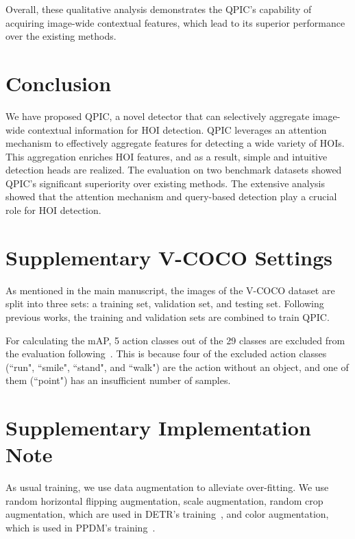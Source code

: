 \documentclass[final]{cvpr}
\begin{document}
Overall, these qualitative analysis demonstrates the QPIC's capability of acquiring image-wide contextual features, which lead to its superior performance over the existing methods. 

\section{Conclusion}
We have proposed QPIC, a novel detector that can selectively aggregate image-wide contextual information for HOI detection. QPIC leverages an attention mechanism to effectively aggregate features for detecting a wide variety of HOIs. 
This aggregation enriches HOI features, and as a result, simple and intuitive detection heads are realized.
The evaluation on two benchmark datasets showed QPIC's significant superiority over existing methods. 
The extensive analysis showed that the attention mechanism and query-based detection play a crucial role for HOI detection.

{\small


}

\renewcommand{\thesection}{\Alph{section}}
\setcounter{section}{0}

\clearpage

\section{Supplementary V-COCO Settings}
As mentioned in the main manuscript, the images of the V-COCO dataset are split into three sets: a training set, validation set, and testing set. Following previous works, the training and validation sets are combined to train QPIC. 

For calculating the mAP, 5 action classes out of the 29 classes are excluded from the evaluation following~\cite{gkioxari_cvpr2018}. This is because four of the excluded action classes (``run", ``smile", ``stand", and ``walk") are the action without an object, and one of them (``point") has an insufficient number of samples.

\section{Supplementary Implementation Note}
As usual training, we use data augmentation to alleviate over-fitting. We use random horizontal flipping augmentation, scale augmentation, random crop augmentation, which are used in DETR's training~\cite{carion_eccv2020}, and color augmentation, which is used in PPDM's training~\cite{liao_cvpr2020}.
\end{document}
